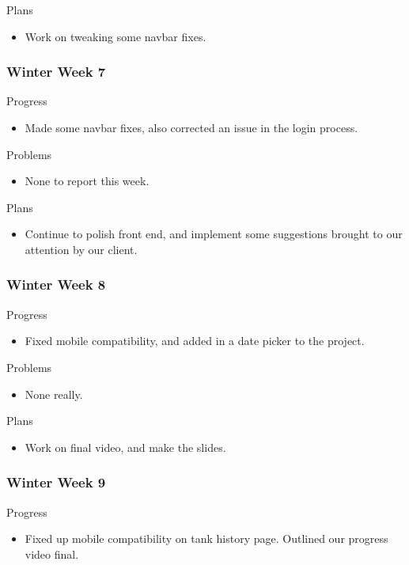        \noindent
        Plans
        \begin{itemize}
            \item Work on tweaking some navbar fixes.
        \end{itemize}
    \subsubsection{Winter Week 7}
        \noindent
        Progress
        \begin{itemize}
            \item Made some navbar fixes, also corrected an issue in the login process.
        \end{itemize}
        
        \noindent
        Problems
        \begin{itemize}
            \item  None to report this week.
        \end{itemize}
        
        \noindent
        Plans
        \begin{itemize}
            \item  Continue to polish front end, and implement some suggestions brought to our attention by our client.
        \end{itemize}
    \subsubsection{Winter Week 8}
        \noindent
        Progress
        \begin{itemize}
            \item Fixed mobile compatibility, and added in a date picker to the project. 
        \end{itemize}
        
        \noindent
        Problems
        \begin{itemize}
            \item None really.
        \end{itemize}
        
        \noindent
        Plans
        \begin{itemize}
            \item Work on final video, and make the slides. 
        \end{itemize}
    \subsubsection{Winter Week 9}
        \noindent
        Progress
        \begin{itemize}
            \item Fixed up mobile compatibility on tank history page. Outlined our progress video final.
        \end{itemize}
        

